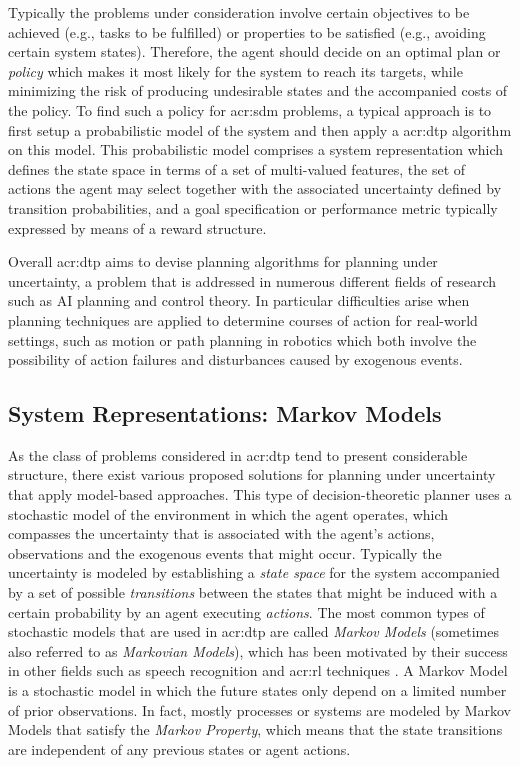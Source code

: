 Typically the problems under consideration involve certain objectives to be achieved (e.g., tasks to be fulfilled) or properties to be satisfied (e.g., avoiding certain system states). 
Therefore, the agent should decide on an optimal plan or \textit{policy} which makes it most likely for the system to reach its targets, while minimizing the risk of producing undesirable states and the accompanied costs of the policy.
To find such a policy for \acrlong{acr:sdm} problems, a typical approach is to first setup a probabilistic model of the system and then apply a \acrshort{acr:dtp} algorithm on this model.
This probabilistic model comprises a system representation which defines the state space in terms of a set of multi-valued features, the set of actions the agent may select together with the associated uncertainty defined by transition probabilities, and a goal specification or performance metric typically expressed by means of a reward structure.

Overall \acrshort{acr:dtp} aims to devise planning algorithms for planning under uncertainty, a problem that is addressed in numerous different fields of research such as AI planning and control theory.
In particular difficulties arise when planning techniques are applied to determine courses of action for real-world settings, such as motion or path planning in robotics which both involve the possibility of action failures and disturbances caused by exogenous events.

\subsection{System Representations: Markov Models}
\label{sec:system-representation}

As the class of problems considered in \acrshort{acr:dtp} tend to present considerable structure, there exist various proposed solutions for planning under uncertainty that apply model-based approaches.
This type of decision-theoretic planner uses a stochastic model of the environment in which the agent operates, which compasses the uncertainty that is associated with the agent's actions, observations and the exogenous events that might occur.
Typically the uncertainty is modeled by establishing a \textit{state space} for the system accompanied by a set of possible \textit{transitions} between the states that might be induced with a certain probability by an agent executing \textit{actions}.
The most common types of stochastic models that are used in \acrshort{acr:dtp} are called \textit{Markov Models} (sometimes also referred to as \textit{Markovian Models}), which has been motivated by their success in other fields such as speech recognition \cite{baker1992large, gales2008application, rabiner1989tutorial} and \acrfull{acr:rl} techniques \cite{kaelbling1996reinforcement, Brafman2002}.
A Markov Model is a stochastic model in which the future states only depend on a limited number of prior observations. In fact, mostly processes or systems are modeled by Markov Models that satisfy the \textit{Markov Property}, which means that the state transitions are independent of any previous states or agent actions.

